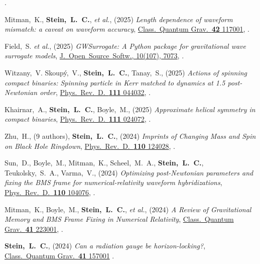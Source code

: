 \begin{etaremune}[start=\value{pubCounter}]
  .
\item
  Mitman,~K.,
  {\bf Stein,~L.~C.},
  {\it et al.},
  (2025)
  {\it Length dependence of waveform mismatch: a caveat on waveform accuracy},
  \href{https://doi.org/10.1088/1361-6382/add8d9}%
  {Class.~Quantum Grav.~{\bf 42} 117001},
  .
\item
  Field,~S.
  {\it et al.},
  (2025)
  {\it GWSurrogate: A Python package for gravitational wave surrogate models},
  \href{https://doi.org/10.21105/joss.07073}{J.~Open~Source~Softw., 10(107), 7073},
  .
\item
  Witzany,~V.
  Skoupý,~V.,
  {\bf Stein,~L.~C.},
  Tanay,~S.,
  (2025)
  {\it Actions of spinning compact binaries: Spinning particle in Kerr matched to dynamics at 1.5 post-Newtonian order},
  \href{https://doi.org/10.1103/PhysRevD.111.044032}%
  {Phys.~Rev.~D.~{\bf 111} 044032},
  .
\item
  Khairnar,~A.,
  {\bf Stein,~L.~C.},
  Boyle,~M.,
  (2025)
  {\it Approximate helical symmetry in compact binaries},
  \href{https://doi.org/10.1103/PhysRevD.111.024072}%
  {Phys.~Rev.~D.~{\bf 111} 024072},
  .
\item
  Zhu,~H.,
  (9 authors),
  {\bf Stein,~L.~C.},
  (2024)
  {\it Imprints of Changing Mass and Spin on Black Hole Ringdown},
  \href{https://doi.org/10.1103/PhysRevD.110.124028}%
  {Phys.~Rev.~D.~{\bf 110} 124028},
  .
\item
  Sun,~D.,
  Boyle,~M.,
  Mitman,~K.,
  Scheel,~M.~A.,
  {\bf Stein,~L.~C.},
  Teukolsky,~S.~A.,
  Varma,~V.,
  (2024)
  {\it Optimizing post-Newtonian parameters and fixing the BMS frame for numerical-relativity waveform hybridizations},
  \href{https://doi.org/10.1103/PhysRevD.110.104076}%
  {Phys.~Rev.~D.~{\bf 110} 104076},
  .
\item
  Mitman,~K.,
  Boyle,~M.,
  {\bf Stein,~L.~C.},
  {\it et al.},
  (2024)
  {\it A Review of Gravitational Memory and BMS Frame Fixing in Numerical Relativity},
  \href{https://doi.org/10.1088/1361-6382/ad83c2}%
  {Class.~Quantum Grav.~{\bf 41} 223001},
  .
\item
  {\bf Stein,~L.~C.},
  (2024)
  {\it Can a radiation gauge be horizon-locking?},
  \href{https://doi.org/10.1088/1361-6382/ad563b}%
  {Class.~Quantum Grav.~{\bf 41} 157001}
  .

\end{etaremune}
